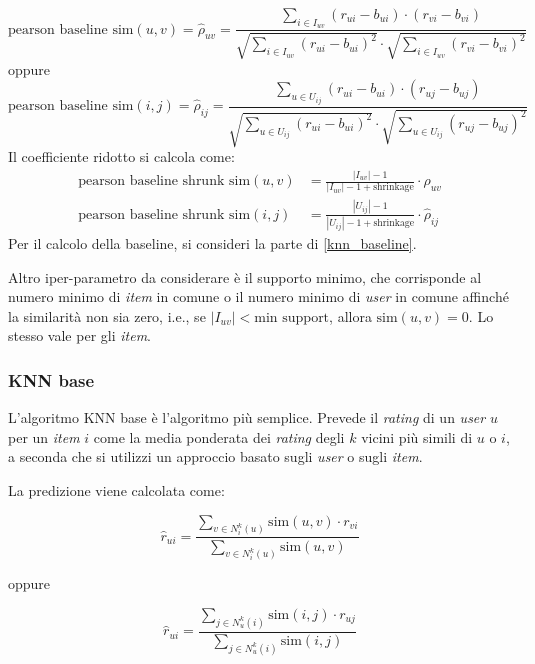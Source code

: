 \begin{itemize}
        \[
        \text{pearson baseline sim}(u, v) = \hat{\rho}_{uv} = \frac{\sum\limits_{i \in I_{uv}} (r_{ui} - b_{ui}) \cdot (r_{vi} - b_{vi})}{\sqrt{\sum\limits_{i \in I_{uv}} (r_{ui} - b_{ui})^2} \cdot \sqrt{\sum\limits_{i \in I_{uv}} (r_{vi} - b_{vi})^2}}
        \]
        oppure
        \[
        \text{pearson baseline sim}(i, j) = \hat{\rho}_{ij} = \frac{\sum\limits_{u \in U_{ij}} (r_{ui} - b_{ui}) \cdot (r_{uj} - b_{uj})}{\sqrt{\sum\limits_{u \in U_{ij}} (r_{ui} - b_{ui})^2} \cdot \sqrt{\sum\limits_{u \in U_{ij}} (r_{uj} - b_{uj})^2}}
        \]
        Il coefficiente ridotto si calcola come:
        \begin{align*}
            \text{pearson baseline shrunk sim}(u, v) &= \frac{|I_{uv}| - 1}{|I_{uv}| - 1 + \text{shrinkage}} \cdot \hat{\rho}_{uv} \\
            \text{pearson baseline shrunk sim}(i, j) &= \frac{|U_{ij}| - 1}{|U_{ij}| - 1 + \text{shrinkage}} \cdot \hat{\rho}_{ij}
        \end{align*}
        Per il calcolo della baseline, si consideri la parte di \ref{knn_baseline}.
\end{itemize}

Altro iper-parametro da considerare è il supporto minimo, che corrisponde al numero minimo di \textit{item} in comune o il numero minimo di \textit{user} in comune affinché la similarità non sia zero, i.e., se $|I_{uv}| < \text{min support}$, allora $\text{sim}(u, v) = 0$. Lo stesso vale per gli \textit{item}.

\subsubsection{KNN base}

L'algoritmo KNN base è l'algoritmo più semplice. Prevede il  \textit{rating} di un \textit{user} $u$ per un \textit{item} $i$ come la media ponderata dei \textit{rating} degli $k$ vicini più simili di $u$ o $i$, a seconda che si utilizzi un approccio basato sugli \textit{user} o sugli \textit{item}.

La predizione viene calcolata come:

\[
\hat{r}_{ui} = \frac{\sum\limits_{v \in N^k_i(u)} \text{sim}(u, v) \cdot r_{vi}}{\sum\limits_{v \in N^k_i(u)} \text{sim}(u, v)}
\]

oppure

\[
\hat{r}_{ui} = \frac{\sum\limits_{j \in N^k_u(i)} \text{sim}(i, j) \cdot r_{uj}}{\sum\limits_{j \in N^k_u(i)} \text{sim}(i, j)}
\]

